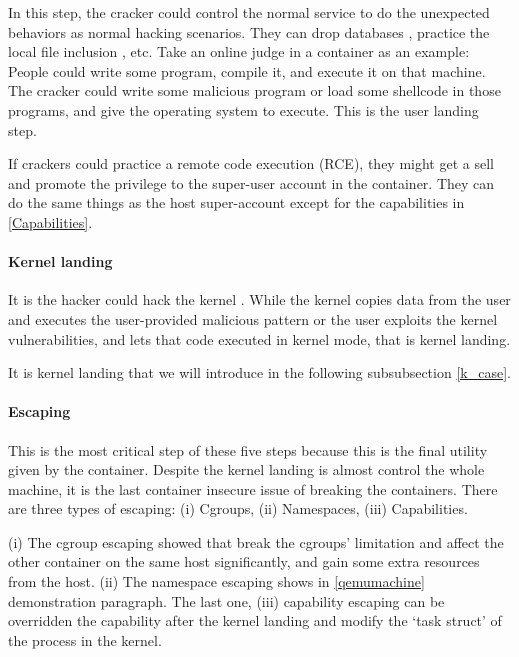 In this step, the cracker could control the normal service to do the unexpected behaviors as
normal hacking scenarios. They can drop databases \cite{halfond2006classification} , practice
the local file inclusion \cite{hassan2018saisan, whitman2011principles}, etc.
Take an online judge in a container as an example: People could write some program, compile it, and execute it
on that machine. The cracker could write some malicious program or load some shellcode in those programs,
and give the operating system to execute. This is the user landing step.

If crackers could practice a remote code execution (RCE), they might get a sell and promote the privilege to
the super-user account in the container. They can do the same things as the host super-account except for
the capabilities in \ref{Capabilities}.

\paragraph{Kernel landing}

It is the hacker could hack the kernel
\cite{gaspar2006root, dam2018automatic, jimenez2016vulnerability, 10.1007/978-1-4020-8739-4_86}.
While the kernel copies data from the user and executes the user-provided malicious pattern
or the user exploits the kernel vulnerabilities, and lets that code executed in kernel mode, that is kernel landing.

It is kernel landing that we will introduce in the following subsubsection \ref{k_case}.

\paragraph{Escaping}

This is the most critical step of these five steps because this is the final utility given by the
container. Despite the kernel landing is almost control the whole machine, it is the last container
insecure issue of breaking the containers. There are three types of escaping: (\Rn{1}) Cgroups,
(\Rn{2}) Namespaces, (\Rn{3}) Capabilities.

(\Rn{1}) The cgroup escaping showed that \textcite{10.1145/3319535.3354227} break the
cgroups' limitation and affect the other container on the same host significantly, and gain
some extra resources from the host. (\Rn{2}) The namespace escaping shows in \ref{qemumachine}
demonstration paragraph.
The last one, (\Rn{3}) capability escaping can be overridden the capability after the kernel landing
and modify the `task struct' of the process in the kernel.

